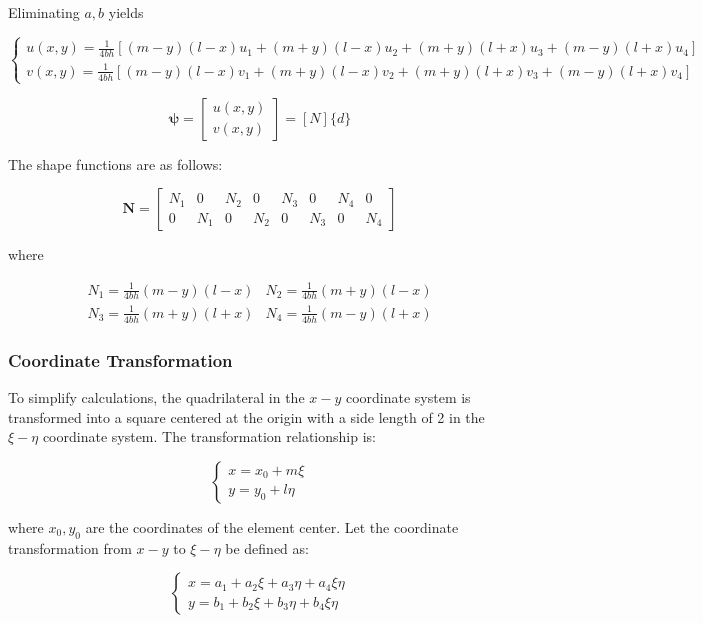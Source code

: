 \documentclass{article}
\begin{document}
Eliminating \( a, b \) yields

\[
\begin{cases}
u(x, y) = \frac{1}{4bh} \left[ (m - y)(l - x)u_1 + (m + y)(l - x)u_2 + (m + y)(l + x)u_3 + (m - y)(l + x)u_4 \right] \\
v(x, y) = \frac{1}{4bh} \left[ (m - y)(l - x)v_1 + (m + y)(l - x)v_2 + (m + y)(l + x)v_3 + (m - y)(l + x)v_4 \right]
\end{cases}
\]

\[
\mathbf{\psi} =
\begin{bmatrix}
u(x, y) \\
v(x, y)
\end{bmatrix} = [N] \{d\}
\]

The shape functions are as follows:

\[
\mathbf{N} = \begin{bmatrix}
N_1 & 0 & N_2 & 0 & N_3 & 0 & N_4 & 0 \\
0 & N_1 & 0 & N_2 & 0 & N_3 & 0 & N_4
\end{bmatrix}
\]

where

\[
\begin{matrix}
N_1 = \frac{1}{4bh} (m - y)(l - x) & N_2 = \frac{1}{4bh} (m + y)(l - x) \\
N_3 = \frac{1}{4bh} (m + y)(l + x) & N_4 = \frac{1}{4bh} (m - y)(l + x)
\end{matrix}
\]

\subsubsection{Coordinate Transformation}
To simplify calculations, the quadrilateral in the \( x-y \) coordinate system is transformed into a square centered at the origin with a side length of 2 in the \( \xi-\eta \) coordinate system. The transformation relationship is:

\[
\begin{cases}
x = x_0 + m \xi \\
y = y_0 + l \eta
\end{cases}
\]

where \( x_0, y_0 \) are the coordinates of the element center.
Let the coordinate transformation from \( x-y \) to \( \xi-\eta \) be defined as:

\[
\begin{cases}
x = a_1 + a_2 \xi + a_3 \eta + a_4 \xi \eta \\
y = b_1 + b_2 \xi + b_3 \eta + b_4 \xi \eta
\end{cases}
\]
\end{document}
